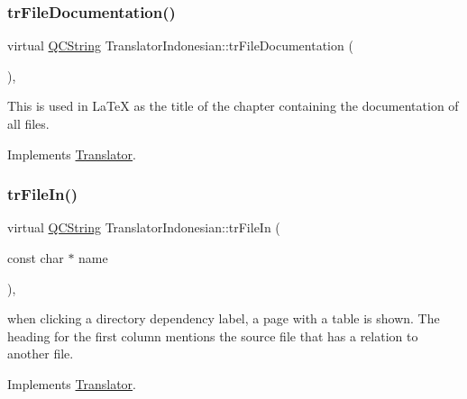 \mbox{\label{class_translator_indonesian_a90da082a228ebbd3a3c6b98de8459842}} 
\subsubsection{\texorpdfstring{trFileDocumentation()}{trFileDocumentation()}}
{\footnotesize\ttfamily virtual \mbox{\hyperlink{class_q_c_string}{Q\+C\+String}} Translator\+Indonesian\+::tr\+File\+Documentation (\begin{DoxyParamCaption}{ }\end{DoxyParamCaption})\hspace{0.3cm}{\ttfamily [inline]}, {\ttfamily [virtual]}}

This is used in La\+TeX as the title of the chapter containing the documentation of all files. 

Implements \mbox{\hyperlink{class_translator}{Translator}}.

\mbox{\label{class_translator_indonesian_acf2807ec680e81bc2fa0070e3240ccb0}} 
\subsubsection{\texorpdfstring{trFileIn()}{trFileIn()}}
{\footnotesize\ttfamily virtual \mbox{\hyperlink{class_q_c_string}{Q\+C\+String}} Translator\+Indonesian\+::tr\+File\+In (\begin{DoxyParamCaption}\item[{const char $\ast$}]{name }\end{DoxyParamCaption})\hspace{0.3cm}{\ttfamily [inline]}, {\ttfamily [virtual]}}

when clicking a directory dependency label, a page with a table is shown. The heading for the first column mentions the source file that has a relation to another file. 

Implements \mbox{\hyperlink{class_translator}{Translator}}.

\mbox{\label{class_translator_indonesian_a50d9cc9dec22664ed528b515836f8a8a}} 
